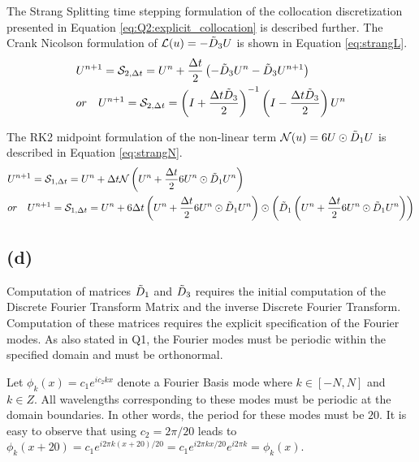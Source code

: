 \documentclass[12pt]{article}
\begin{document}
The Strang Splitting time stepping formulation of the collocation discretization presented in Equation \ref{eq:Q2:explicit_collocation} is described further. The Crank Nicolson formulation of $\mathcal{L}(u) = -\Tilde{D}_3 U$ is shown in Equation \ref{eq:strangL}.
\begin{equation}
\begin{aligned}
    & U^{n + 1} = \mathcal{S}_{2, \Delta t} = U^n + \frac{\Delta t}{2}\left( -\Tilde{D}_3 U^n - \Tilde{D}_3 U^{n + 1} \right) \\
    & or \quad U^{n + 1} = \mathcal{S}_{2, \Delta t} = \left( I + \frac{\Delta t \Tilde{D}_3 }{2} \right)^{-1} \left( I - \frac{\Delta t \Tilde{D}_3}{2} \right) U^n
\end{aligned} 
\label{eq:strangL}
\end{equation}

The RK2 midpoint formulation of the non-linear term $\mathcal{N}(u) = 6U \odot \Tilde{D}_1 U$ is described in Equation \ref{eq:strangN}.
\begin{equation}
    \begin{aligned}
        & U^{n + 1} = \mathcal{S}_{1, \Delta t} = U^{n} + \Delta t \mathcal{N}\left( U^n + \frac{\Delta t}{2} 6U^n \odot \Tilde{D}_1 U^n \right) \\
        &  or \quad U^{n + 1} = \mathcal{S}_{1, \Delta t} = U^{n} + 6 \Delta t \left( U^n + \frac{\Delta t}{2} 6U^n \odot \Tilde{D}_1 U^n \right) \odot \left( \Tilde{D}_1 \left( U^n + \frac{\Delta t}{2} 6U^n \odot \Tilde{D}_1 U^n \right) \right)
    \end{aligned}
\label{eq:strangN}
\end{equation}
\subsection{(d)}
Computation of matrices $\Tilde{D}_1$ and $\Tilde{D}_3$ requires the initial computation of the Discrete Fourier Transform Matrix and the inverse Discrete Fourier Transform. Computation of these matrices requires the explicit specification of the Fourier modes. As also stated in Q1, the Fourier modes must be periodic within the specified domain and must be orthonormal. 

Let $\phi_k(x) = c_1 e^{i c_2 k x}$ denote a Fourier Basis mode where $k \in [-N, N]$ and $k \in Z$. All wavelengths corresponding to these modes must be periodic at the domain boundaries. In other words, the period for these modes must be $20$. It is easy to observe that using $c_2 = 2\pi / 20$ leads to $\phi_k(x + 20) = c_1 e^{i2 \pi k (x + 20)/20} = c_1 e^{i2 \pi k x/20} e^{i 2\pi k} = \phi_k(x)$. 
\end{document}
